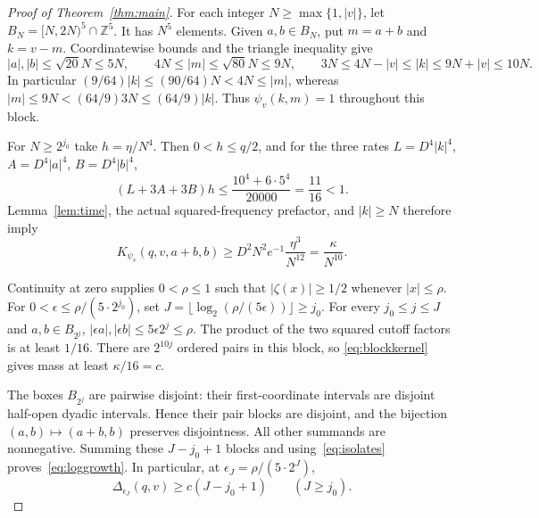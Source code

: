 \documentclass[11pt]{article}
\newcommand{\Z}{\mathbb Z}
\begin{document}
\begin{proof}[Proof of Theorem~\ref{thm:main}]
For each integer $N\ge\max\{1,|v|\}$, let
$B_N=[N,2N)^5\cap\Z^5$. It has $N^5$ elements. Given
$a,b\in B_N$, put $m=a+b$ and $k=v-m$.
Coordinatewise bounds and the triangle inequality give
\[
 |a|,|b|\le\sqrt{20}N\le5N,\qquad
 4N\le|m|\le\sqrt{80}N\le9N,\qquad
 3N\le4N-|v|\le|k|\le9N+|v|\le10N.
\]
In particular
$(9/64)|k|\le(90/64)N<4N\le|m|$, whereas
$|m|\le9N<(64/9)3N\le(64/9)|k|$.
Thus $\psi_v(k,m)=1$ throughout this block.

For $N\ge2^{j_0}$ take $h=\eta/N^4$. Then $0<h\le q/2$, and for the three rates
$L=D^4|k|^4$, $A=D^4|a|^4$, $B=D^4|b|^4$,
\[
 (L+3A+3B)h
 \le\frac{10^4+6\cdot5^4}{20000}=\frac{11}{16}<1.
\]
Lemma~\ref{lem:time}, the actual squared-frequency prefactor,
and $|k|\ge N$ therefore imply
\begin{equation}\label{eq:blockkernel}
 K_{\psi_v}(q,v,a+b,b)
 \ge D^2N^2 e^{-1}\frac{\eta^3}{N^{12}}
 =\frac\kappa{N^{10}}.
\end{equation}

Continuity at zero supplies $0<\rho\le1$ such that
$|\zeta(x)|\ge1/2$ whenever $|x|\le\rho$.
For $0<\epsilon\le\rho/(5\cdot2^{j_0})$, set
$J=\lfloor\log_2(\rho/(5\epsilon))\rfloor\ge j_0$.
For every $j_0\le j\le J$ and $a,b\in B_{2^j}$,
$|\epsilon a|,|\epsilon b|\le5\epsilon2^j\le\rho$.
The product of the two squared cutoff factors is at least $1/16$.
There are $2^{10j}$ ordered pairs in this block, so
\eqref{eq:blockkernel} gives mass at least $\kappa/16=c$.

The boxes $B_{2^j}$ are pairwise disjoint: their first-coordinate
intervals are disjoint half-open dyadic intervals. Hence their pair
blocks are disjoint, and the bijection $(a,b)\mapsto(a+b,b)$ preserves
disjointness. All other summands are nonnegative. Summing these $J-j_0+1$
blocks and using~\eqref{eq:isolates} proves~\eqref{eq:loggrowth}.
In particular, at $\epsilon_J=\rho/(5\cdot2^J)$,
\begin{equation}\label{eq:dyadic}
 \Delta_{\epsilon_J}(q,v)\ge c(J-j_0+1)\qquad(J\ge j_0).
\end{equation}
\end{proof}
\end{document}
